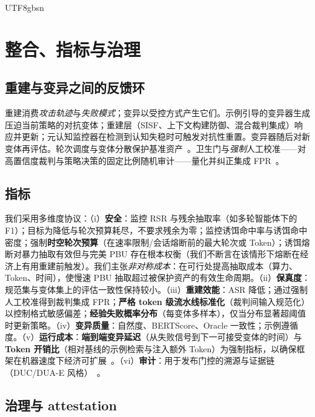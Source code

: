\documentclass[letterpaper,twocolumn,10pt]{article}
\begin{document}
\begin{CJK}{UTF8}{gbsn}
\section{整合、指标与治理}
\label{sec:integration}

\subsection{重建与变异之间的反馈环}

重建消费\emph{攻击轨迹}与\emph{失败模式}；变异以受控方式产生它们。示例引导的变异器生成压迫当前策略的对抗变体；重建层（SISF、上下文构建防御、混合裁判集成）响应并更新；元认知监控器在检测到认知失稳时可触发对抗性重置。变异器随后对新变体再评估。轮次调度与变体分散保护基准资产~\cite{ControlledMutation_SafetyEval}。卫生门与\emph{强制}人工校准——对高置信度裁判与策略决策的固定比例随机审计——量化并纠正集成 FPR~\cite{tc260-governance}。

\subsection{指标}

我们采用多维度协议：（i）\textbf{安全}：监控 RSR 与残余抽取率（如多轮智能体下的 F1）；目标为降低与轮次预算耗尽，不要求残余为零；监控诱饵命中率与诱饵命中密度；强制\textbf{时空轮次预算}（在速率限制/会话熔断前的最大轮次或 Token）；诱饵熔断对暴力抽取有效但与完美 PBU 存在根本权衡（我们不断言在该情形下熔断在经济上有用重建前触发）。我们主张\emph{非对称成本}：在可行处提高抽取成本（算力、Token、时间），使慢速 PBU 抽取超过被保护资产的有效生命周期。（ii）\textbf{保真度}：规范集与变体集上的评估一致性保持较小。（iii）\textbf{重建效能}：ASR 降低；通过强制人工校准得到裁判集成 FPR；\textbf{严格 token 级流水线标准化}（裁判间输入规范化）以控制格式敏感偏差；\textbf{经验失败概率分布}（每变体多样本），仅当分布显著超阈值时更新策略。（iv）\textbf{变异质量}：自然度、BERTScore、Oracle 一致性；示例遵循度。（v）\textbf{运行成本}：\textbf{端到端变异延迟}（从失败信号到下一可接受变体的时间）与\textbf{Token 开销比}（相对基线的示例检索与注入额外 Token）为强制指标，以确保框架在机器速度下经济可扩展~\cite{ControlledMutation_SafetyEval}。（vi）\textbf{审计}：用于发布门控的溯源与证据链（DUC/DUA-E 风格）~\cite{dual-use-attestations,ControlledMutation_SafetyEval}。

\subsection{治理与 attestation}


\end{CJK}
\end{document}
